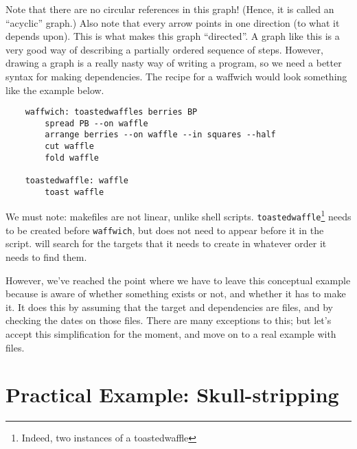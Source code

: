 Note that there are no circular references in this graph! (Hence, it is called an ``acyclic'' graph.) Also note that every arrow points in one direction (to what it depends upon). This is what makes this graph ``directed''. A graph like this is a very good way of describing a partially ordered sequence of steps.  However, drawing a graph is a really nasty way of writing a program, so we need a better syntax for making dependencies. The \maken{} recipe for a waffwich would look something like the example below.

%	

\begin{lstlisting}
	waffwich: toastedwaffles berries BP
		spread PB --on waffle
		arrange berries --on waffle --in squares --half
		cut waffle
		fold waffle
		
	toastedwaffle: waffle
		toast waffle
\end{lstlisting}

We must note: makefiles are not linear, unlike shell
scripts. \texttt{toastedwaffle}\footnote{Indeed, two instances of a toastedwaffle} needs to be created before \texttt{waffwich}, but does not need to appear before it in the script. \maken{} will search for the targets that it needs to create in whatever order it needs to find them.

However, we've reached the point where we have to leave this conceptual example because \maken{} is aware of whether something exists or not, and whether it has to make it. It does this by assuming that the target and dependencies are files, and by checking the dates on those files. There are many exceptions to this; but let's accept this simplification for the moment, and move on to a real example with files.

\section{Practical Example: Skull-stripping}

